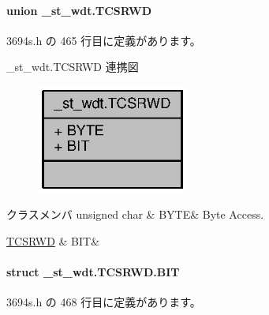 \paragraph{union \+\_\+st\+\_\+wdt.\+T\+C\+S\+R\+W\+D}


 3694s.\+h の 465 行目に定義があります。



\+\_\+st\+\_\+wdt.\+T\+C\+S\+R\+W\+D 連携図
\nopagebreak
\begin{figure}[H]
\begin{center}
\leavevmode
\includegraphics[width=142pt]{d8/d54/union__st__wdt_8TCSRWD__coll__graph}
\end{center}
\end{figure}
\begin{DoxyFields}{クラスメンバ}
unsigned char\label{3694s_8h_ae409eb2ba6eb6801f52763ae370c350e}
&
B\+Y\+T\+E&
Byte Access. \\
\hline

\hyperlink{3694s_8h_d9/d2a/struct__st__wdt_8TCSRWD_8BIT}{T\+C\+S\+R\+W\+D}\label{3694s_8h_adb957fdc8000e1eef04a243f5199aa52}
&
B\+I\+T&
\\
\hline

\end{DoxyFields}
\label{struct__st__wdt_8TCSRWD_8BIT}
\paragraph{struct \+\_\+st\+\_\+wdt.\+T\+C\+S\+R\+W\+D.\+B\+I\+T}


 3694s.\+h の 468 行目に定義があります。



